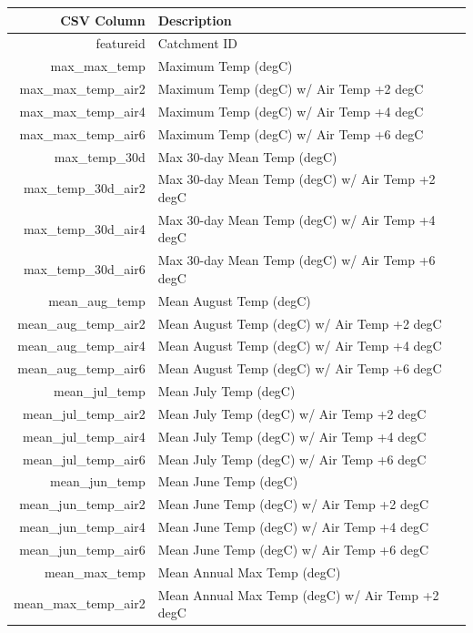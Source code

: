 \documentclass[
]{book}
\begin{document}
\begin{tabular}{r|l}
\hline
CSV Column & Description\\
\hline
featureid & Catchment ID\\
\hline
max\_max\_temp & Maximum Temp (degC)\\
\hline
max\_max\_temp\_air2 & Maximum Temp (degC) w/ Air Temp +2 degC\\
\hline
max\_max\_temp\_air4 & Maximum Temp (degC) w/ Air Temp +4 degC\\
\hline
max\_max\_temp\_air6 & Maximum Temp (degC) w/ Air Temp +6 degC\\
\hline
max\_temp\_30d & Max 30-day Mean Temp (degC)\\
\hline
max\_temp\_30d\_air2 & Max 30-day Mean Temp (degC) w/ Air Temp +2 degC\\
\hline
max\_temp\_30d\_air4 & Max 30-day Mean Temp (degC) w/ Air Temp +4 degC\\
\hline
max\_temp\_30d\_air6 & Max 30-day Mean Temp (degC) w/ Air Temp +6 degC\\
\hline
mean\_aug\_temp & Mean August Temp (degC)\\
\hline
mean\_aug\_temp\_air2 & Mean August Temp (degC) w/ Air Temp +2 degC\\
\hline
mean\_aug\_temp\_air4 & Mean August Temp (degC) w/ Air Temp +4 degC\\
\hline
mean\_aug\_temp\_air6 & Mean August Temp (degC) w/ Air Temp +6 degC\\
\hline
mean\_jul\_temp & Mean July Temp (degC)\\
\hline
mean\_jul\_temp\_air2 & Mean July Temp (degC) w/ Air Temp +2 degC\\
\hline
mean\_jul\_temp\_air4 & Mean July Temp (degC) w/ Air Temp +4 degC\\
\hline
mean\_jul\_temp\_air6 & Mean July Temp (degC) w/ Air Temp +6 degC\\
\hline
mean\_jun\_temp & Mean June Temp (degC)\\
\hline
mean\_jun\_temp\_air2 & Mean June Temp (degC) w/ Air Temp +2 degC\\
\hline
mean\_jun\_temp\_air4 & Mean June Temp (degC) w/ Air Temp +4 degC\\
\hline
mean\_jun\_temp\_air6 & Mean June Temp (degC) w/ Air Temp +6 degC\\
\hline
mean\_max\_temp & Mean Annual Max Temp (degC)\\
\hline
mean\_max\_temp\_air2 & Mean Annual Max Temp (degC) w/ Air Temp +2 degC\\

\end{tabular}
\end{document}
